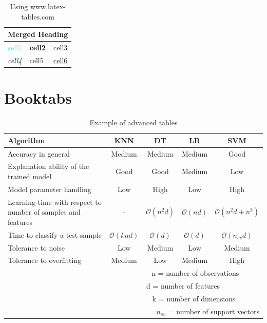 \documentclass[a4paper, 10pt, english]{extarticle}
\begin{document}
\begin{table}[H]
    \centering
    \caption{Using www.latex-tables.com}
    \begin{tabular}{lll} 
    \hline
    \multicolumn{3}{|l|}{Merged Heading} \\ 
    \hline
    \textcolor{cyan}{cell1} & \textbf{cell2} & cell3 \\
    \textit{cell4} & cell5 & \uline{cell6} 
    \end{tabular}
\end{table}

\section{Booktabs}
\begin{table}[H]
    \centering
    \caption{Example of advanced tables}
    \medskip
    \small
    \begin{tabular}{lcccc}
        \toprule 
        Algorithm & KNN & DT  & LR & SVM \\ \midrule
        \rowcolor[gray]{.9} Accuracy in general & Medium & Medium & Medium & Good\\
        Explanation ability of the trained model & Good & Good & Medium & Low\\ 
        \rowcolor[gray]{.9} Model parameter handling & Low & High & Low & High \\ 
        Learning time with respect to number of samples and features & - & $\mathcal{O}(n^2 d)$ & $\mathcal{O}(n d)$ & $\mathcal{O}(n^2 d + n^3)$ \\ 
        \rowcolor[gray]{.9} Time to classify a test sample & $\mathcal{O}(k n d)$ & $\mathcal{O}(d)$ & $\mathcal{O}(d)$ & $\mathcal{O}(n_{sv}d)$   \\
        Tolerance to noise &  Low & Medium & Low & Medium \\
        \rowcolor[gray]{.9} Tolerance to overfitting & Medium & Low & Medium & High \\
        \multicolumn{5}{r}{n = number of observations ~~~~~} \\
        \multicolumn{5}{r}{d = number of features \,~~~~~~~~~~} \\
        \multicolumn{5}{r}{k = number of dimensions ~~~~~~} \\
        \multicolumn{5}{r}{$n_{sv}$ = number of support vectors} \\
        \bottomrule
    \end{tabular}
\end{table}
\end{document}
